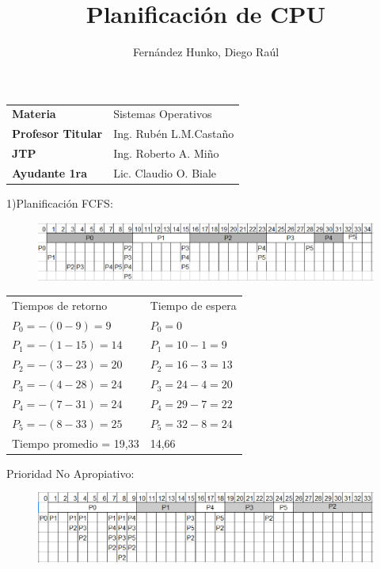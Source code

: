 \documentclass[twoside, a4paper]{article}
\title{\Huge{Planif\mbox{}icaci\'on de CPU}}
\author{\Large{Fern\'andez Hunko, Diego Ra\'ul}}
\begin{document}
\maketitle

\begin{tabular}{l l}
\textbf{\large{Materia}} & \large{Sistemas Operativos} \\
\textbf{\large{Profesor Titular}} & \large{Ing. Rub\'en L.M.Casta\~no} \\      
\textbf{\large{JTP}} & \large{Ing. Roberto A. Mi\~no} \\
\textbf{\large{Ayudante 1ra}} & \large{Lic. Claudio O. Biale} \\
\end{tabular}

\newpage

1)Planif\mbox{}icaci\'on FCFS:\\
\begin{figure}[!htb]
\includegraphics[scale=0.60]{FCFS.eps}
\end{figure}
\begin{tabular}{l l}
Tiempos de retorno & Tiempo de espera\\
$P_0 =-(0 - 9)= 9$ & $P_0 = 0$ \\
$P_1 =-(1 - 15)= 14$ & $P_1 =10-1=9$ \\
$P_2 =-(3 - 23)= 20$ & $P_2 =16-3=13$\\
$P_3 =-(4 - 28)= 24$ & $P_3 =24-4=20$\\
$P_4 =-(7 - 31)= 24$ & $P_4 =29-7=22$\\
$P_5 =-(8 - 33)= 25$ & $P_5 =32-8=24$\\
Tiempo promedio = 19,33 & 14,66
\end{tabular}
\newline
Prioridad No Apropiativo:\\
\begin{figure}[!htb]
\includegraphics[scale=0.60]{Prioridad-noApropiativo.eps}
\end{figure}
\end{document}
